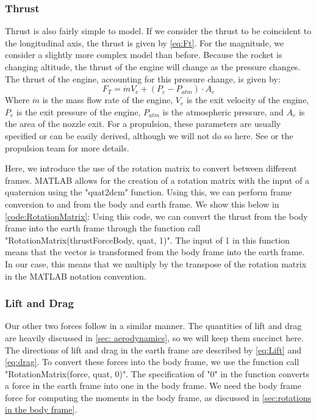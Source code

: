 \documentclass[12pt]{report}
\begin{document}
\subsubsection{Thrust}
Thrust is also fairly simple to model. If we consider the thrust to be coincident to the longitudinal axis, the thrust is given by \eqref{eq:Ft}. For the magnitude, we consider a slightly more complex model than before. Because the rocket is changing altitude, the thrust of the engine will change as the pressure changes. The thrust of the engine, accounting for this pressure change, is given by:
\begin{equation}
    F_T=\dot{m}V_e+\left(P_{e}-P_{atm}\right)\cdot A_e
\end{equation}
Where $\dot{m}$ is the mass flow rate of the engine, $V_e$ is the exit velocity of the engine, $P_e$ is the exit pressure of the engine, $P_{atm}$ is the atmospheric pressure, and $A_e$ is the area of the nozzle exit. For a propulsion, these parameters are usually specified or can be easily derived, although we will not do so here. See \cite{noauthor_chemical_nodate} or the propulsion team for more details.

Here, we introduce the use of the rotation matrix to convert between different frames. MATLAB allows for the creation of a rotation matrix with the input of a \gls{quaternion} using the "quat2dcm" function. Using this, we can perform frame conversion to and from the body and earth frame. We show this below in \ref{code:RotationMatrix}:
\label{code:RotationMatrix}
Using this code, we can convert the thrust from the body frame into the earth frame through the function call "RotationMatrix(thrustForceBody, quat, 1)". The input of 1 in this function means that the vector is transformed from the body frame into the earth frame. In our case, this means that we multiply by the transpose of the rotation matrix in the MATLAB notation convention.
\subsubsection{Lift and Drag}
Our other two forces follow in a similar manner. The quantities of lift and drag are heavily discussed in \ref{sec: aerodynamics}, so we will keep them succinct here. The directions of lift and drag in the earth frame are described by \eqref{eq:Lift} and \eqref{eq:drag}. To convert these forces into the body frame, we use the function call "RotationMatrix(force, quat, 0)". The specification of "0" in the function converts a force in the earth frame into one in the body frame. We need the body frame force for computing the moments in the body frame, as discussed in \ref{sec:rotations in the body frame}.
\end{document}
